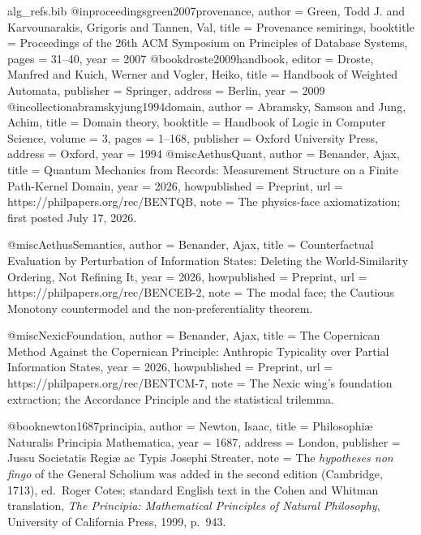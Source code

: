 \begin{filecontents}[overwrite]{alg_refs.bib}
@inproceedings{green2007provenance,
  author = {Green, Todd J. and Karvounarakis, Grigoris and Tannen, Val},
  title = {Provenance semirings},
  booktitle = {Proceedings of the 26th ACM Symposium on Principles of Database Systems},
  pages = {31--40}, year = {2007}
}
@book{droste2009handbook,
  editor = {Droste, Manfred and Kuich, Werner and Vogler, Heiko},
  title = {Handbook of Weighted Automata},
  publisher = {Springer}, address = {Berlin}, year = {2009}
}
@incollection{abramskyjung1994domain,
  author = {Abramsky, Samson and Jung, Achim},
  title = {Domain theory},
  booktitle = {Handbook of Logic in Computer Science},
  volume = {3}, pages = {1--168},
  publisher = {Oxford University Press}, address = {Oxford}, year = {1994}
}
@misc{AethusQuant,
  author       = {Benander, Ajax},
  title        = {Quantum Mechanics from Records: Measurement Structure on a Finite Path-Kernel Domain},
  year         = {2026},
  howpublished = {Preprint},
  url          = {https://philpapers.org/rec/BENTQB},
  note         = {The physics-face axiomatization; first posted July 17, 2026.}
}

@misc{AethusSemantics,
  author       = {Benander, Ajax},
  title        = {Counterfactual Evaluation by Perturbation of Information States: Deleting the World-Similarity Ordering, Not Refining It},
  year         = {2026},
  howpublished = {Preprint},
  url          = {https://philpapers.org/rec/BENCEB-2},
  note         = {The modal face; the Cautious Monotony countermodel and the
                  non-preferentiality theorem.}
}

@misc{NexicFoundation,
  author       = {Benander, Ajax},
  title        = {The Copernican Method Against the Copernican Principle: Anthropic Typicality over Partial Information States},
  year         = {2026},
  howpublished = {Preprint},
  url          = {https://philpapers.org/rec/BENTCM-7},
  note         = {The Nexic wing's foundation extraction; the Accordance Principle
                  and the statistical trilemma.}
}

@book{newton1687principia,
  author    = {Newton, Isaac},
  title     = {Philosophi\ae{} Naturalis Principia Mathematica},
  year      = {1687},
  address   = {London},
  publisher = {Jussu Societatis Regi\ae{} ac Typis Josephi Streater},
  note      = {The \emph{hypotheses non fingo} of the General Scholium was added in
               the second edition (Cambridge, 1713), ed.\ Roger Cotes; standard
               English text in the Cohen and Whitman translation,
               \emph{The Principia: Mathematical Principles of Natural Philosophy},
               University of California Press, 1999, p.~943.}
}


\end{filecontents}
